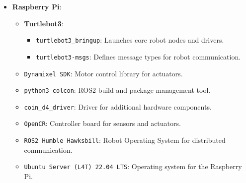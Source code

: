 \begin{itemize}
    \item \textbf{Raspberry Pi}:
    \begin{itemize}
        \item \textbf{Turtlebot3}:
        \begin{itemize}
            \item \texttt{turtlebot3\_bringup}: Launches core robot nodes and drivers.
            \item \texttt{turtlebot3-msgs}: Defines message types for robot communication.
        \end{itemize}
        \item \texttt{Dynamixel SDK}: Motor control library for actuators.
        \item \texttt{python3-colcon}: ROS2 build and package management tool.
        \item \texttt{coin\_d4\_driver}: Driver for additional hardware components.
        \item \texttt{OpenCR}: Controller board for sensors and actuators.
        \item \texttt{ROS2 Humble Hawksbill}: Robot Operating System for distributed communication.
        \item \texttt{Ubuntu Server (L4T) 22.04 LTS}: Operating system for the Raspberry Pi.
    \end{itemize}


\end{itemize}
